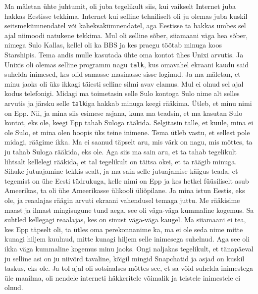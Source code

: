 Ma mäletan ühte juhtumit, oli juba tegelikult siis, kui vaikselt Internet juba 
hakkas Eestisse tekkima. Internet kui selline tehniliselt oli ju olemas juba 
 kuskil seitsmekümnendatel või kaheksakümnendatel, aga  Eestisse  ta hakkas umbes sel 
ajal niimoodi natukene  tekkima. Mul oli selline sõber, siiamaani väga hea 
sõber, nimega Sulo Kallas, kellel oli ka BBS ja kes praegu 
töötab minuga koos Starshipis. Tema andis 
mulle kasutada ühte oma kontot ühes Unixi arvutis. Ja Unixis oli olemas selline 
programm nagu \verb|talk|, kus omavahel ekraani kaudu said suhelda 
inimesed, kes olid samasse masinasse sisse loginud. Ja ma mäletan, et  minu 
jaoks oli üks ikkagi täiesti selline silmi avav elamus. Mul ei olnud sel ajal 
kodus telefonigi. Midagi ma toimetasin selle Sulo kontoga Sulo nime alt 
selles arvutis ja järsku selle \verb|talk|iga  hakkab minuga keegi 
rääkima.  Ütleb, et minu nimi on Epp. Nii, ja mina siis esimese asjana, kuna ma 
teadsin, et ma kasutan Sulo kontot, eks ole, keegi Epp tahab Suloga rääkida. 
Selgitasin talle, et kuule, mina ei ole Sulo, et mina olen hoopis üks 
teine inimene. Tema ütleb vastu, et  sellest pole midagi, räägime ikka. Ma ei 
saanud täpselt aru, mis värk on nagu, mis mõttes, ta ju tahab Suloga rääkida, 
eks ole. Aga siis ma sain aru, et ta tahab tegelikult lihtsalt kellelegi 
rääkida, et tal  tegelikult on täitsa okei, et ta räägib  minuga. Sihuke 
jutuajamine tekkis sealt, ja ma sain selle jutuajamise käigus teada, et  
tegemist on ühe Eesti tüdrukuga, kelle nimi on Epp ja kes hetkel füüsiliselt 
asub Ameerikas, ta oli ühe Ameerikasse  ülikooli üliõpilane. 
Ja mina istun Eestis, eks ole, ja reaalajas räägin arvuti 
ekraani vahendusel  temaga juttu. Me rääkisime maast ja ilmast 
mingisugune tund aega, see oli  väga-väga kummaline kogemus. Sa  suhtled 
kellegagi reaalajas, kes on  sinust väga-väga kaugel. Ma siiamaani ei tea, 
kes Epp täpselt oli, ta ütles oma perekonnanime ka, ma ei ole seda nime mitte 
kunagi hiljem kuulnud, mitte kunagi hiljem selle inimesega suhelnud. Aga see 
oli ikka väga kummaline kogemus minu jaoks. Ongi naljakas tegelikult, et 
tänapäeval ju selline asi on ju niivõrd tavaline, kõigil mingid Snapchatid ja 
asjad on kuskil taskus, eks ole. Ja tol ajal oli sotsiaalses mõttes see, et sa 
võid suhelda inimestega üle maailma,  oli nendele interneti häkkeritele 
võimalik ja teistele inimestele ei olnud.


